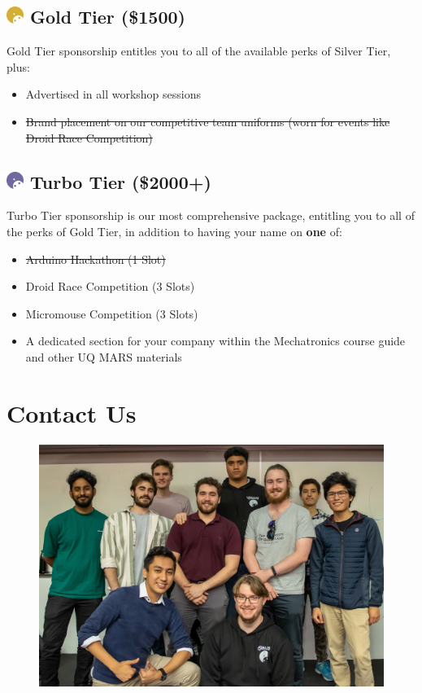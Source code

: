 \documentclass[a4paper,12pt]{report}
\begin{document}
\subsection*{
    \includegraphics[width=1em]{../assets/Sponsor Icons/Gold}
    \textcolor{sponsor_gold}{Gold Tier (\$1500)}
}
Gold Tier sponsorship entitles you to all of the available perks of Silver Tier, plus:
\begin{itemize}
    \item Advertised in all workshop sessions
    \item \st{Brand placement on our competitive team uniforms (worn for events like Droid Race Competition)}
\end{itemize}

\subsection*{
    \includegraphics[width=1em]{../assets/Sponsor Icons/Turbo.png}
    \textcolor{turbo_purple}{Turbo Tier (\$2000+)}
}
Turbo Tier sponsorship is our most comprehensive package, entitling you to all of the perks of Gold Tier, in addition to having your name on \textbf{one} of:
\begin{itemize}
    \item \st{Arduino Hackathon (1 Slot)}
    \item Droid Race Competition (3 Slots)
    \item Micromouse Competition (3 Slots)
    \item A dedicated section for your company within the Mechatronics course guide and other UQ MARS materials
\end{itemize}

\newpage

\section*{Contact Us}
\begin{figure}[H]
    \centering
    \includegraphics[width=0.9\linewidth]{Photos/Exec.jpg}
\end{figure}
\end{document}
